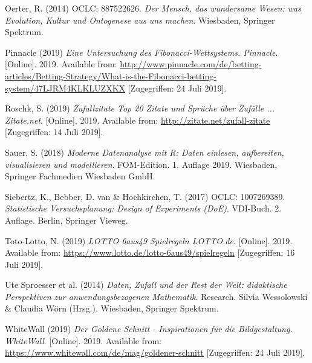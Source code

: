 \documentclass[ngerman,]{article}
\begin{document}
\hypertarget{ref-oerter_mensch_2014}{}
Oerter, R. (2014) OCLC: 887522626. \emph{Der Mensch, das wundersame
Wesen: was Evolution, Kultur und Ontogenese aus uns machen}. Wiesbaden,
Springer Spektrum.

\hypertarget{ref-pinnacle_untersuchung_2019}{}
Pinnacle (2019) \emph{Eine Untersuchung des Fibonacci-Wettsystems.
Pinnacle}. {[}Online{]}. 2019. Available from:
\url{http://www.pinnacle.com/de/betting-articles/Betting-Strategy/What-is-the-Fibonacci-betting-system/47LJRM4KLKLUZXKX}
{[}Zugegriffen: 24 Juli 2019{]}.

\hypertarget{ref-roschk_zufallzitate_2019}{}
Roschk, S. (2019) \emph{Zufallzitate Top 20 Zitate und Sprüche über
Zufälle ... Zitate.net}. {[}Online{]}. 2019. Available from:
\url{http://zitate.net/zufall-zitate} {[}Zugegriffen: 14 Juli 2019{]}.

\hypertarget{ref-sauer_moderne_2018}{}
Sauer, S. (2018) \emph{Moderne Datenanalyse mit R: Daten einlesen,
aufbereiten, visualisieren und modellieren}. FOM-Edition. 1. Auflage
2019. Wiesbaden, Springer Fachmedien Wiesbaden GmbH.

\hypertarget{ref-siebertz_statistische_2017}{}
Siebertz, K., Bebber, D. van \& Hochkirchen, T. (2017) OCLC: 1007269389.
\emph{Statistische Versuchsplanung: Design of Experiments (DoE)}.
VDI-Buch. 2. Auflage. Berlin, Springer Vieweg.

\hypertarget{ref-toto-lotto_lotto_2019}{}
Toto-Lotto, N. (2019) \emph{LOTTO 6aus49 Spielregeln LOTTO.de}.
{[}Online{]}. 2019. Available from:
\url{https://www.lotto.de/lotto-6aus49/spielregeln} {[}Zugegriffen: 16
Juli 2019{]}.

\hypertarget{ref-ute_sproesser_et_al._daten_2014}{}
Ute Sproesser et al. (2014) \emph{Daten, Zufall und der Rest der Welt:
didaktische Perspektiven zur anwendungsbezogenen Mathematik}. Research.
Silvia Wessolowski \& Claudia Wörn (Hrsg.). Wiesbaden, Springer
Spektrum.

\hypertarget{ref-whitewall_goldene_2019}{}
WhiteWall (2019) \emph{Der Goldene Schnitt - Inspirationen für die
Bildgestaltung. WhiteWall}. {[}Online{]}. 2019. Available from:
\url{https://www.whitewall.com/de/mag/goldener-schnitt} {[}Zugegriffen:
24 Juli 2019{]}.
\end{document}
